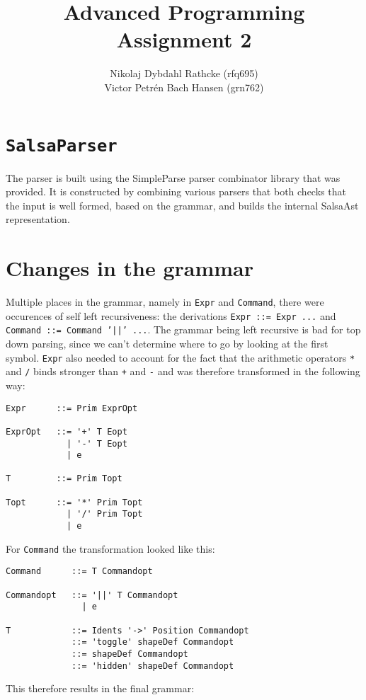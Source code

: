 \documentclass[a4paper]{article}
\author{Nikolaj Dybdahl Rathcke (rfq695) \\ Victor Petrén Bach Hansen (grn762)}
\title{Advanced Programming \\ Assignment 2}
\begin{document}
\maketitle
\section*{\texttt{SalsaParser}}
The parser is built using the SimpleParse parser combinator library that was provided. It is constructed by combining various parsers that both checks that the input is well formed, based on the grammar, and builds the internal SalsaAst representation.

\section*{Changes in the grammar}
Multiple places in the grammar, namely in \texttt{Expr} and \texttt{Command}, there were occurences of self left recursiveness: the derivations \texttt{Expr ::= Expr ...} and \texttt{Command ::= Command '||' ...}.
The grammar being left recursive is bad for top down parsing, since we can't determine where to go by looking at the first symbol.
\texttt{Expr} also needed to account for the fact that the arithmetic operators \texttt{*} and \texttt{/} binds stronger than \texttt{+} and \texttt{-} and was therefore transformed in the following way:
\begin{verbatim}
Expr      ::= Prim ExprOpt

ExprOpt   ::= '+' T Eopt
            | '-' T Eopt
            | e

T         ::= Prim Topt

Topt      ::= '*' Prim Topt
            | '/' Prim Topt
            | e
\end{verbatim}
For \texttt{Command} the transformation looked like this:
\begin{verbatim}
Command      ::= T Commandopt

Commandopt   ::= '||' T Commandopt
               | e

T            ::= Idents '->' Position Commandopt
             ::= 'toggle' shapeDef Commandopt
             ::= shapeDef Commandopt
             ::= 'hidden' shapeDef Commandopt
\end{verbatim}
This therefore results in the final grammar:
\end{document}
